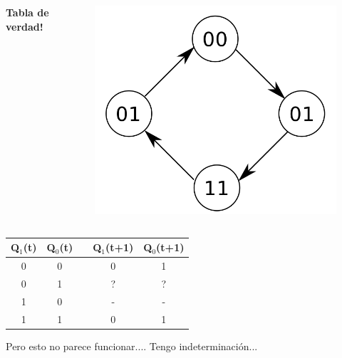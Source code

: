 \documentclass[10pt]{beamer}
\begin{document}
\begin{frame}
{\begin{columns}
            \textbf{Tabla de verdad!}
              \begin{figure}[h!]
                  \centering
                  \includegraphics[scale=0.2]{ej1.png}
              \end{figure}
      \end{columns}
\begin{table}[h!]
      \begin{tabular}{|c|c|c|c|c|}
      \hline
      Q$_1$(t) & Q$_0$(t) &  & Q$_1$(t+1) & Q$_0$(t+1) \\ \hline
      0        & 0        &  & 0          & 1          \\ \hline
      0        & 1        &  & ?          & ?          \\ \hline
      1        & 0        &  & -          & -          \\ \hline
      1        & 1        &  & 0          & 1          \\ \hline
      \end{tabular}
      \end{table}Pero esto no parece funcionar.... Tengo indeterminación...}
\end{frame}
\end{document}

